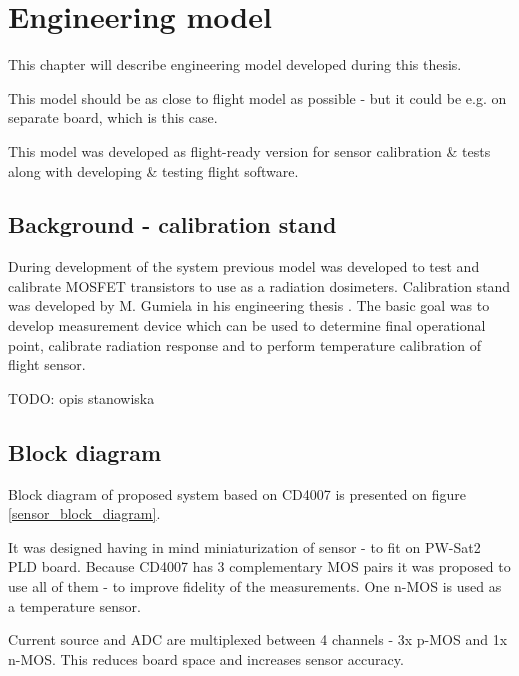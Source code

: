 \chapter{Engineering model}
\label{Engineering_model_chapter}
This chapter will describe engineering model developed during this thesis.

This model should be as close to flight model as possible - but it could be e.g. on separate board, which is this case.

This model was developed as flight-ready version for sensor calibration \& tests along with developing \& testing flight software.

\section{Background - calibration stand}
    During development of the system previous model was developed to test and calibrate MOSFET transistors to use as a radiation dosimeters. Calibration stand was developed by M. Gumiela in his engineering thesis \cite{MGThesis}. The basic goal was to develop measurement device which can be used to determine final operational point, calibrate radiation response and to perform temperature calibration of flight sensor.

    TODO: opis stanowiska


\section{Block diagram}
    Block diagram of proposed system based on CD4007 is presented on figure \ref{sensor_block_diagram}.

    It was designed having in mind miniaturization of sensor - to fit on PW-Sat2 PLD board. Because CD4007 has 3 complementary MOS pairs it was proposed to use all of them - to improve fidelity of the measurements. One n-MOS is used as a temperature sensor.

    Current source and ADC are multiplexed between 4 channels - 3x p-MOS and 1x n-MOS. This reduces board space and increases sensor accuracy.

